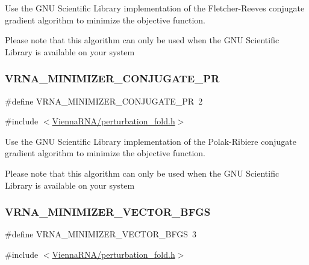 Use the G\+NU Scientific Library implementation of the Fletcher-\/\+Reeves conjugate gradient algorithm to minimize the objective function. 

Please note that this algorithm can only be used when the G\+NU Scientific Library is available on your system \mbox{\label{group__perturbation_ga5aaeafe1b0aa77a5cda18943ff94b02f}} 
\subsubsection{\texorpdfstring{VRNA\_MINIMIZER\_CONJUGATE\_PR}{VRNA\_MINIMIZER\_CONJUGATE\_PR}}
{\footnotesize\ttfamily \#define V\+R\+N\+A\+\_\+\+M\+I\+N\+I\+M\+I\+Z\+E\+R\+\_\+\+C\+O\+N\+J\+U\+G\+A\+T\+E\+\_\+\+PR~2}



{\ttfamily \#include $<$\mbox{\hyperlink{perturbation__fold_8h}{Vienna\+R\+N\+A/perturbation\+\_\+fold.\+h}}$>$}



Use the G\+NU Scientific Library implementation of the Polak-\/\+Ribiere conjugate gradient algorithm to minimize the objective function. 

Please note that this algorithm can only be used when the G\+NU Scientific Library is available on your system \mbox{\label{group__perturbation_ga9be8a702cddf58235571ace11cc41b22}} 
\subsubsection{\texorpdfstring{VRNA\_MINIMIZER\_VECTOR\_BFGS}{VRNA\_MINIMIZER\_VECTOR\_BFGS}}
{\footnotesize\ttfamily \#define V\+R\+N\+A\+\_\+\+M\+I\+N\+I\+M\+I\+Z\+E\+R\+\_\+\+V\+E\+C\+T\+O\+R\+\_\+\+B\+F\+GS~3}



{\ttfamily \#include $<$\mbox{\hyperlink{perturbation__fold_8h}{Vienna\+R\+N\+A/perturbation\+\_\+fold.\+h}}$>$}



